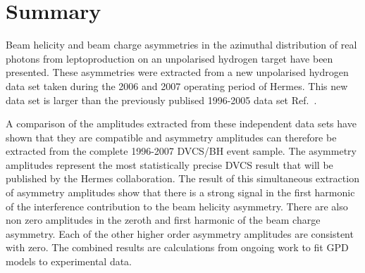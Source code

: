 \section{Summary}

Beam helicity and beam charge asymmetries in the azimuthal distribution of real photons from leptoproduction on an unpolarised hydrogen target have been presented. These asymmetries were extracted from a new unpolarised hydrogen data set taken during the 2006 and 2007 operating period of H{\sc ermes}.  This new data set is larger than the previously publised 1996-2005 data set Ref.~\cite{2009a}.

A comparison of the amplitudes extracted from these independent data sets have shown that they are compatible and asymmetry amplitudes can therefore be extracted from the complete 1996-2007 DVCS/BH event sample. The  asymmetry amplitudes represent the most statistically precise DVCS result that will be published by the H{\sc ermes} collaboration. The result of this simultaneous extraction of asymmetry amplitudes show that there is a strong signal in the first harmonic of the interference contribution to the beam helicity asymmetry. There are also non zero amplitudes in the zeroth and first harmonic of the beam charge asymmetry. Each of the other higher order asymmetry amplitudes are consistent with zero. The combined results are  calculations from ongoing work to fit GPD models to experimental data. 



